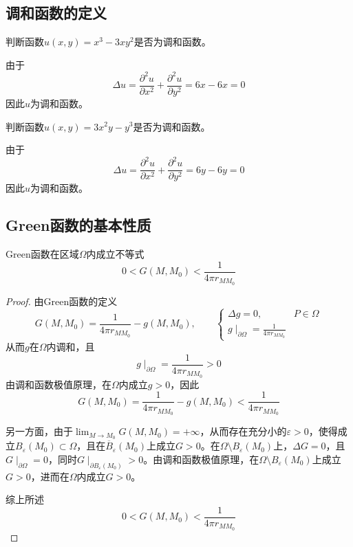 \documentclass[lang = cn, scheme = chinese, thmcnt = section]{elegantbook}
\newcommand{\sub}{\subset}             %
\begin{document}
\subsection{调和函数的定义}

\begin{example}
	判断函数$u(x,y)=x^3-3xy^2$是否为调和函数。
\end{example}

\begin{solution}
	由于
	$$
	\Delta u
	=\frac{\partial^2 u}{\partial x^2}+\frac{\partial^2 u}{\partial y^2}
	=6x-6x=0
	$$
	因此$u$为调和函数。
\end{solution}

\begin{example}
	判断函数$u(x,y)=3x^2y-y^3$是否为调和函数。
\end{example}

\begin{solution}
	由于
	$$
	\Delta u
	=\frac{\partial^2 u}{\partial x^2}+\frac{\partial^2 u}{\partial y^2}
	=6y-6y=0
	$$
	因此$u$为调和函数。
\end{solution}

\subsection{Green函数的基本性质}

\begin{proposition}
	Green函数在区域$\Omega$内成立不等式
	$$
	0<G(M,M_0)<\frac{1}{4\pi r_{MM_0}}
	$$
\end{proposition}

\begin{proof}
	由Green函数的定义
	$$
	G(M,M_0)=\frac{1}{4\pi r_{MM_0}}-g(M,M_0),\qquad 
	\begin{cases}
		\Delta g=0,\qquad & P\in\Omega\\
		g\mid_{\partial\Omega}=\frac{1}{4\pi r_{MM_0}}
	\end{cases}
	$$
	从而$g$在$\Omega$内调和，且
	$$
	g\mid_{\partial\Omega}=\frac{1}{4\pi r_{MM_0}}>0
	$$
	由调和函数极值原理，在$\Omega$内成立$g>0$​，因此
	$$
	G(M,M_0)=\frac{1}{4\pi r_{MM_0}}-g(M,M_0)<\frac{1}{4\pi r_{MM_0}}
	$$
	
	另一方面，由于$\displaystyle \lim_{M\to M_0}G(M,M_0)=+\infty$，从而存在充分小的$\varepsilon>0$，使得成立$B_\varepsilon(M_0)\sub\Omega$，且在$\overline{B}_\varepsilon(M_0)$上成立$G>0$。在$\Omega\setminus B_\varepsilon(M_0)$上，$\Delta G=0$，且$G\mid_{\partial \Omega}=0$，同时$G\mid_{\partial B_\varepsilon(M_0)}>0$。由调和函数极值原理，在$\Omega\setminus B_\varepsilon(M_0)$上成立$G>0$，进而在$\Omega$内成立$G>0$。
	
	综上所述
	$$
	0<G(M,M_0)<\frac{1}{4\pi r_{MM_0}}
	$$
\end{proof}
\end{document}
